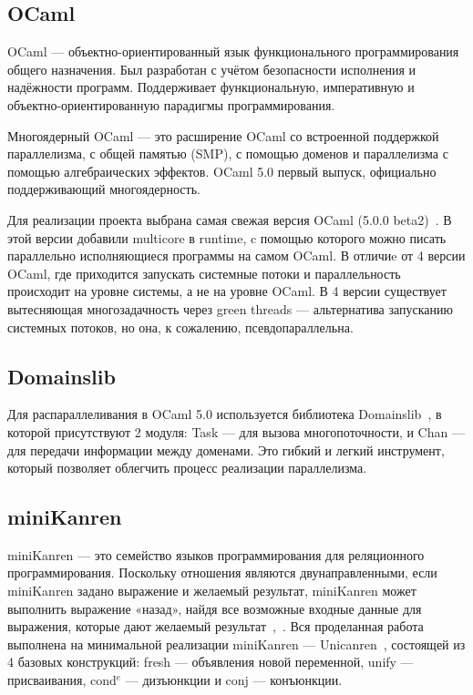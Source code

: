 \subsection{OCaml} OCaml --- объектно-ориентированный язык
функционального программирования общего назначения.
Был разработан с учётом безопасности исполнения и надёжности 
программ. Поддерживает функциональную, императивную
и объектно-ориентированную парадигмы программирования. 

Многоядерный OCaml --- это расширение OCaml со
встроенной поддержкой параллелизма, с
общей памятью (SMP), с помощью доменов и
параллелизма с помощью алгебраических эффектов. 
OCaml 5.0 первый 
выпуск, официально поддерживающий многоядерность.

Для реализации проекта выбрана самая свежая версия OCaml (5.0.0 beta2)~\cite{ocaml}.
В этой версии добавили multicore в runtime, c помощью которого можно
писать параллельно исполняющиеся программы на самом OCaml. В отличиe от 4 версии
OCaml, где приходится запускать системные потоки и параллельность происходит на уровне системы, 
а не на уровне OCaml. В 4 версии существует вытесняющая многозадачность 
через green threads --- альтернатива запусканию системных потоков, но она, к сожалению, псевдопараллельна.


\subsection{Domainslib} Для распараллеливания в OCaml 5.0 
используется библиотека Domainslib~\cite{domainslib}, 
в которой присутствуют 2 модуля: Task --- для вызова
многопоточности, и Chan --- для передачи информации между
доменами. Это гибкий и легкий инструмент, который позволяет 
облегчить процесс реализации параллелизма.

\subsection{miniKanren} miniKanren --- это семейство 
языков программирования для реляционного программирования. 
Поскольку отношения являются двунаправленными, если miniKanren 
задано выражение и желаемый результат, miniKanren может выполнить 
выражение «назад», найдя все возможные входные данные для 
выражения, которые дают желаемый результат~\cite{miniKanren},~\cite{berd}.
Вся проделанная работа выполнена на минимальной реализации
miniKanren --- Unicanren~\cite{unicanren}, состоящей из 4 базовых конструкций:
fresh --- объявления новой переменной, unify --- присваивания, cond$^e$ --- дизъюнкции и conj --- конъюнкции.
